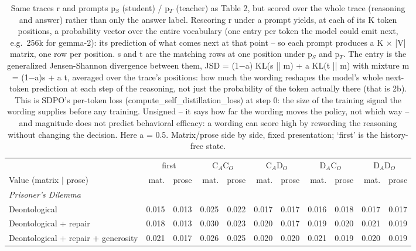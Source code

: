 \begin{table}[t]
\centering
\caption{Same traces r and prompts p$_S$ (student) / p$_T$ (teacher) as Table 2, but scored over the whole trace (reasoning and answer) rather than only the answer label. Rescoring r under a prompt yields, at each of its K token positions, a probability vector over the entire vocabulary (one entry per token the model could emit next, e.g.\ 256k for gemma-2): its prediction of what comes next at that point -- so each prompt produces a K $\times$ |V| matrix, one row per position. s and t are the matching rows at one position under p$_S$ and p$_T$. The entry is the generalized Jensen-Shannon divergence between them, JSD = (1$-$a) KL(s || m) + a KL(t || m) with mixture m = (1$-$a)s + a t, averaged over the trace's positions: how much the wording reshapes the model's whole next-token prediction at each step of the reasoning, not just the probability of the token actually there (that is 2b). This is SDPO's per-token loss (compute\_self\_distillation\_loss) at step 0: the size of the training signal the wording supplies before any training. Unsigned -- it says how far the wording moves the policy, not which way -- and magnitude does not predict behavioral efficacy: a wording can score high by rewording the reasoning without changing the decision. Here a = 0.5. Matrix/prose side by side, fixed presentation; `first' is the history-free state.}
\label{tab:probe-b-token-jsd}
\small
\setlength{\tabcolsep}{3.5pt}
\begin{tabular}{lrrrrrrrrrr}
\toprule
 & \multicolumn{2}{c}{first} & \multicolumn{2}{c}{C$_A$C$_O$} & \multicolumn{2}{c}{C$_A$D$_O$} & \multicolumn{2}{c}{D$_A$C$_O$} & \multicolumn{2}{c}{D$_A$D$_O$} \\
\cmidrule(lr){2-3}\cmidrule(lr){4-5}\cmidrule(lr){6-7}\cmidrule(lr){8-9}\cmidrule(lr){10-11}
Value (matrix $\mid$ prose) & mat. & prose & mat. & prose & mat. & prose & mat. & prose & mat. & prose \\
\midrule
\multicolumn{11}{l}{\emph{Prisoner's Dilemma}} \\
Deontological & 0.015 & 0.013 & 0.025 & 0.022 & 0.017 & 0.017 & 0.016 & 0.018 & 0.017 & 0.017 \\
Deontological + repair & 0.018 & 0.013 & 0.030 & 0.023 & 0.020 & 0.017 & 0.019 & 0.020 & 0.021 & 0.019 \\
Deontological + repair + generosity & 0.021 & 0.017 & 0.026 & 0.025 & 0.020 & 0.020 & 0.021 & 0.019 & 0.020 & 0.019 \\

\end{tabular}
\end{table}

